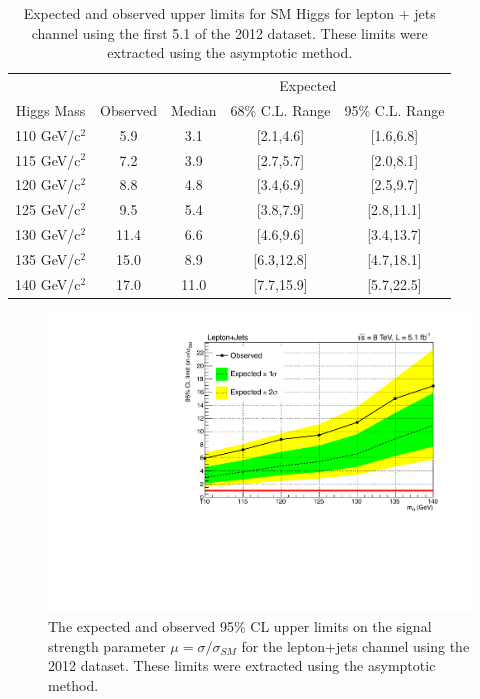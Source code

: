 \begin{table}[hbtp] 
  \centering 
{
\begin{tabular}{|c|c|ccc|} \hline 
           &          & \multicolumn{3}{c|}{Expected} \\
Higgs Mass & Observed & Median & 68\% C.L. Range &  95\% C.L. Range  \\ \hline
110 GeV/c$^2$ & 5.9 & 3.1 & [2.1,4.6] & [1.6,6.8] \\
115 GeV/c$^2$ & 7.2 & 3.9 & [2.7,5.7] & [2.0,8.1] \\
120 GeV/c$^2$ & 8.8 & 4.8 & [3.4,6.9] & [2.5,9.7] \\
125 GeV/c$^2$ & 9.5 & 5.4 & [3.8,7.9] & [2.8,11.1] \\
130 GeV/c$^2$ & 11.4 & 6.6 & [4.6,9.6] & [3.4,13.7] \\
135 GeV/c$^2$ & 15.0 & 8.9 & [6.3,12.8] & [4.7,18.1] \\
140 GeV/c$^2$ & 17.0 & 11.0 & [7.7,15.9] & [5.7,22.5] \\
\hline
\end{tabular}}
    \caption{Expected and observed upper limits for SM Higgs for
      lepton + jets channel using the first 5.1 \fbinv of the 2012 dataset.  These limits were extracted using the asymptotic method.} 	
  \label{tab:lvjj_limitTable}
\end{table} 


\begin{figure}[hbtp] 
  {\centering
    \includegraphics[width=1.0\textwidth]{Figures/Analysis_1_Diagrams/limits_lj_ttH_mH_limit_ExpAndObs_shape_cropPrelim.pdf}
    \caption{The expected and observed 95\% CL upper limits on the signal strength parameter $\mu = \sigma / \sigma_{SM}$ for the lepton+jets channel using the 2012 dataset.  These limits were extracted using the asymptotic method.}
    \label{fig:lvjj_limit}}
\end{figure}

